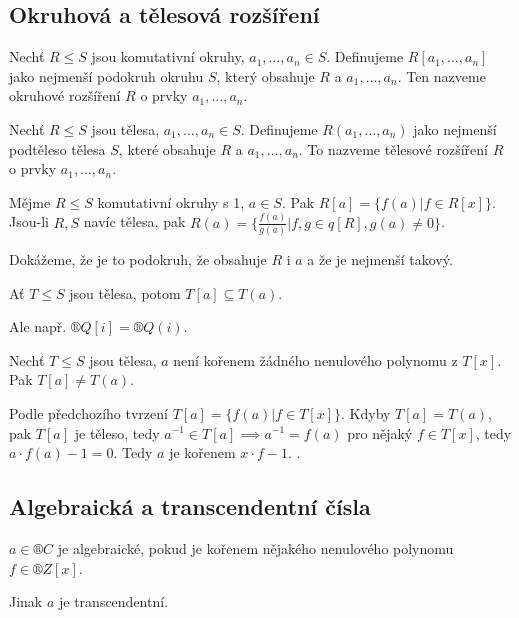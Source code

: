 \documentclass[12pt]{article}                   %
\begin{document}
    \subsection{Okruhová a tělesová rozšíření}
        \begin{definice}
            Nechť $R ≤ S$ jsou komutativní okruhy, $a_1, …, a_n \in S$. Definujeme $R[a_1, …, a_n]$ jako nejmenší podokruh okruhu $S$, který obsahuje $R$ a $a_1, …, a_n$. Ten nazveme okruhové rozšíření $R$ o prvky $a_1, …, a_n$.

            Nechť $R ≤ S$ jsou tělesa, $a_1, …, a_n \in S$. Definujeme $R(a_1, …, a_n)$ jako nejmenší podtěleso tělesa $S$, které obsahuje $R$ a $a_1, …, a_n$. To nazveme tělesové rozšíření $R$ o prvky $a_1, …, a_n$.
        \end{definice}

        \begin{tvrzeni}
            Mějme $R ≤ S$ komutativní okruhy s 1, $a \in S$. Pak $R[a] = \{f(a) | f \in R[x]\}$. Jsou-li $R, S$ navíc tělesa, pak $R(a) = \{\frac{f(a)}{g(a)} | f, g \in q[R], g(a) ≠ 0\}$.

            \begin{dukazin}
                Dokážeme, že je to podokruh, že obsahuje $R$ i $a$ a že je nejmenší takový.
            \end{dukazin}
        \end{tvrzeni}


        \begin{pozorovani}
            Ať $T ≤ S$ jsou tělesa, potom $T[a] \subseteq T(a)$.

            Ale např. $®Q[i] = ®Q(i)$.
        \end{pozorovani}

        \begin{tvrzeni}
            Nechť $T ≤ S$ jsou tělesa, $a$ není kořenem žádného nenulového polynomu z $T[x]$. Pak $T[a] ≠ T(a)$.

            \begin{dukazin}
                Podle předchozího tvrzení $T[a] = \{f(a) | f \in T[x]\}$. Kdyby $T[a] = T(a)$, pak $T[a]$ je těleso, tedy $a^{-1} \in T[a] \implies a^{-1} = f(a)$ pro nějaký $f \in T[x]$, tedy $a·f(a) - 1 = 0$. Tedy $a$ je kořenem $x·f - 1$. \lightning.
            \end{dukazin}
        \end{tvrzeni}

    \subsection{Algebraická a transcendentní čísla}
        \begin{definice}
            $a \in ®C$ je algebraické, pokud je kořenem nějakého nenulového polynomu $f \in ®Z[x]$.

            Jinak $a$ je transcendentní.
        \end{definice}
\end{document}
